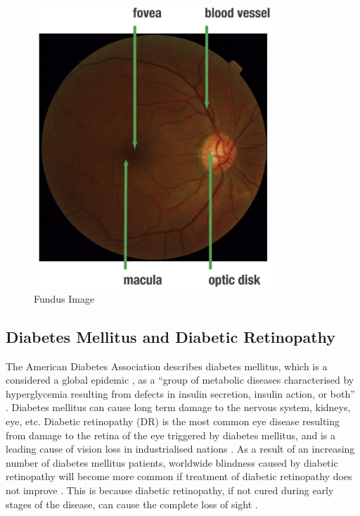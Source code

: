\begin{figure}[t]
\centering
\includegraphics[width=0.8\textwidth]{Figures/fundus_photography_anatomical}
\caption{Fundus Image \citep[from][]{mookiah2015application}}
\label{fundusPhotoRetina}
\end{figure}


\subsection{Diabetes Mellitus and Diabetic Retinopathy}
The American Diabetes Association describes diabetes mellitus, which is a considered a global epidemic \citep{falt2012modern}, as a ``group of metabolic diseases characterised by hyperglycemia resulting from defects in insulin secretion, insulin action, or both'' \citep{national1979classification}. Diabetes mellitus can cause long term damage to the nervous system, kidneys, eye, etc. Diabetic retinopathy (DR) is the most common eye disease resulting from damage to the retina of the eye triggered by diabetes mellitus, and is a leading cause of vision loss in industrialised nations \citep{antal2014ensemble, stitt2013advances}. As a result of an increasing number of diabetes mellitus patients, worldwide blindness caused by diabetic retinopathy will become more common if treatment of diabetic retinopathy does not improve \citep{wilkinson2003proposed}. This is because diabetic retinopathy, if not cured during early stages of the disease, can cause the complete loss of sight \citep{rocha2011points}. 

